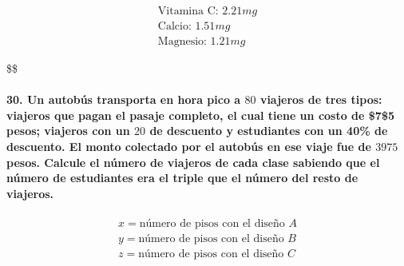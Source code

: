 \documentclass[
]{article}
\begin{document}
\rightarrow

\begin{align*}
    \text{Vitamina C: } 2.21mg\\
    \text{Calcio: }1.51mg\\
    \text{Magnesio: }1.21mg
\end{align*}

\$\$

\hypertarget{un-autobuxfas-transporta-en-hora-pico-a-80-viajeros-de-tres-tipos-viajeros-que-pagan-el-pasaje-completo-el-cual-tiene-un-costo-de-75-pesos-viajeros-con-un-20-de-descuento-y-estudiantes-con-un-40-de-descuento.-el-monto-colectado-por-el-autobuxfas-en-ese-viaje-fue-de-3975-pesos.-calcule-el-nuxfamero-de-viajeros-de-cada-clase-sabiendo-que-el-nuxfamero-de-estudiantes-era-el-triple-que-el-nuxfamero-del-resto-de-viajeros.}{%
\paragraph{\texorpdfstring{30. Un autobús transporta en hora pico a
\(80\) viajeros de tres tipos: viajeros que pagan el pasaje completo, el
cual tiene un costo de \$7\$5 pesos; viajeros con un \(20%
\) de descuento y estudiantes con un 40\% de descuento. El monto
colectado por el autobús en ese viaje fue de \(3975\) pesos. Calcule el
número de viajeros de cada clase sabiendo que el número de estudiantes
era el triple que el número del resto de
viajeros.}{30. Un autobús transporta en hora pico a 80 viajeros de tres tipos: viajeros que pagan el pasaje completo, el cual tiene un costo de \$7\$5 pesos; viajeros con un 20\% de descuento y estudiantes con un 40\% de descuento. El monto colectado por el autobús en ese viaje fue de 3975 pesos. Calcule el número de viajeros de cada clase sabiendo que el número de estudiantes era el triple que el número del resto de viajeros.}}\label{un-autobuxfas-transporta-en-hora-pico-a-80-viajeros-de-tres-tipos-viajeros-que-pagan-el-pasaje-completo-el-cual-tiene-un-costo-de-75-pesos-viajeros-con-un-20-de-descuento-y-estudiantes-con-un-40-de-descuento.-el-monto-colectado-por-el-autobuxfas-en-ese-viaje-fue-de-3975-pesos.-calcule-el-nuxfamero-de-viajeros-de-cada-clase-sabiendo-que-el-nuxfamero-de-estudiantes-era-el-triple-que-el-nuxfamero-del-resto-de-viajeros.}}

\[
\begin{align*}
    x = \text{número de pisos con el diseño } A \\
    y = \text{número de pisos con el diseño } B \\
    z = \text{número de pisos con el diseño } C \\
\end{align*}
\]
\end{document}
